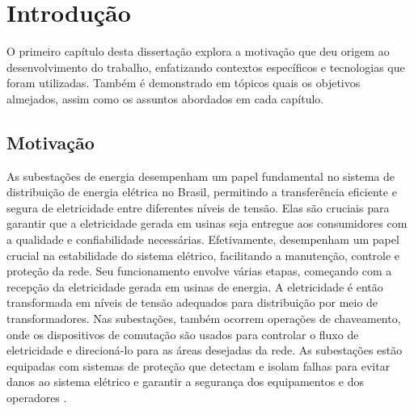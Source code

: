 \chapter{Introdução}

O primeiro capítulo desta dissertação explora a motivação que deu origem ao desenvolvimento do trabalho, enfatizando contextos específicos e tecnologias que foram utilizadas. Também é demonstrado em tópicos quais os objetivos almejados, assim como os assuntos abordados em cada capítulo.

\section{Motivação}

As subestações de energia desempenham um papel fundamental no sistema de distribuição de energia elétrica no Brasil, permitindo a transferência eficiente e segura de eletricidade entre diferentes níveis de tensão. Elas são cruciais para garantir que a eletricidade gerada em usinas seja entregue aos consumidores com a qualidade e confiabilidade necessárias. Efetivamente, desempenham um papel crucial na estabilidade do sistema elétrico, facilitando a manutenção, controle e proteção da rede. Seu funcionamento envolve várias etapas, começando com a recepção da eletricidade gerada em usinas de energia. A eletricidade é então transformada em níveis de tensão adequados para distribuição por meio de transformadores. Nas subestações, também ocorrem operações de chaveamento, onde os dispositivos de comutação são usados para controlar o fluxo de eletricidade e direcioná-lo para as áreas desejadas da rede. As subestações estão equipadas com sistemas de proteção que detectam e isolam falhas para evitar danos ao sistema elétrico e garantir a segurança dos equipamentos e dos operadores \cite {randolph2013electric}.

